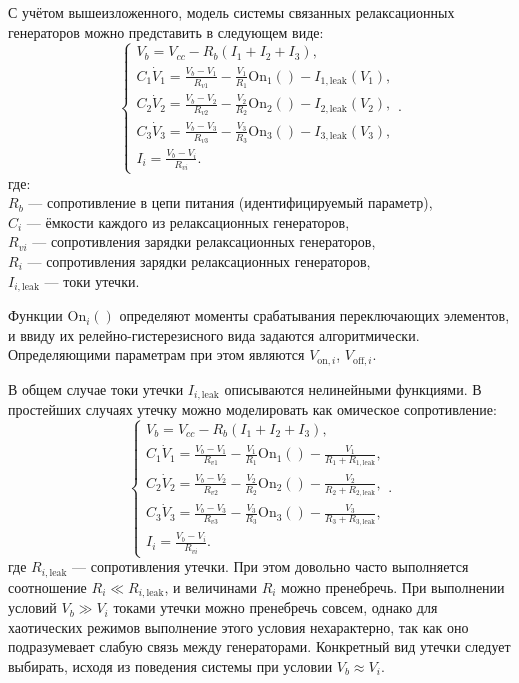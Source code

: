 С учётом вышеизложенного, модель системы связанных релаксационных генераторов
можно представить в следующем виде:
%
\begin{equation}
  \begin{cases}
    V_b = V_{cc} - R_b ( I_1 + I_2 + I_3 ), \\
      C_1 \dot{V}_1 = \frac{V_b-V_1}{R_{v1}} - \frac{V_1}{R_1} \mathrm{On}_1() - I_{1,\mathrm{leak}}(V_1), \\
      C_2 \dot{V}_2 = \frac{V_b-V_2}{R_{v2}} - \frac{V_2}{R_2} \mathrm{On}_2() - I_{2,\mathrm{leak}}(V_2), \\
      C_3 \dot{V}_3 = \frac{V_b-V_3}{R_{v3}} - \frac{V_3}{R_3} \mathrm{On}_3() - I_{3,\mathrm{leak}}(V_3), \\
      I_i = \frac{V_b-V_i}{R_{vi}}.
  \end{cases}.
    \label{atu:eq:relax3}
\end{equation}
%
где: \\
$R_b$ --- сопротивление в цепи питания (идентифицируемый параметр), \\
$C_i$ --- ёмкости каждого из релаксационных генераторов, \\
$R_{vi}$ --- сопротивления зарядки релаксационных генераторов, \\
$R_{i}$ --- сопротивления зарядки релаксационных генераторов, \\
$I_{i,\mathrm{leak}}$ --- токи утечки.

Функции $ \mathrm{On}_i() $ определяют моменты срабатывания переключающих элементов,
и ввиду их релейно-гистерезисного вида
задаются алгоритмически. Определяющими параметрам при этом являются
$V_{\mathrm{on},i}$, $V_{\mathrm{off},i}$.

В общем случае токи утечки $I_{i,\mathrm{leak}}$ описываются нелинейными функциями.
В простейших случаях утечку можно моделировать как омическое сопротивление:
%
\begin{equation}
  \begin{cases}
    V_b = V_{cc} - R_b ( I_1 + I_2 + I_3 ), \\
      C_1 \dot{V}_1 = \frac{V_b-V_1}{R_{v1}} - \frac{V_1}{R_1} \mathrm{On}_1() - \frac{V_1}{R_1+R_{1,\mathrm{leak}}}, \\
      C_2 \dot{V}_2 = \frac{V_b-V_2}{R_{v2}} - \frac{V_2}{R_2} \mathrm{On}_2() - \frac{V_2}{R_2+R_{2,\mathrm{leak}}}, \\
      C_3 \dot{V}_3 = \frac{V_b-V_3}{R_{v3}} - \frac{V_3}{R_3} \mathrm{On}_3() - \frac{V_3}{R_3+R_{3,\mathrm{leak}}}, \\
      I_i = \frac{V_b-V_i}{R_{vi}}.
  \end{cases}.
    \label{atu:eq:relax3_linleak}
\end{equation}
%
где
$R_{i,\mathrm{leak}}$ --- сопротивления утечки.
При этом довольно часто выполняется соотношение
$R_{i} \ll R_{i,\mathrm{leak}} $, и величинами
$R_{i}$ можно пренебречь. При выполнении условий
$V_b \gg V_i$ токами утечки можно пренебречь совсем,
однако для хаотических режимов выполнение этого условия нехарактерно,
так как оно подразумевает слабую связь между генераторами.
Конкретный вид утечки следует выбирать, исходя из поведения системы
при условии $V_b \approx V_i$.

